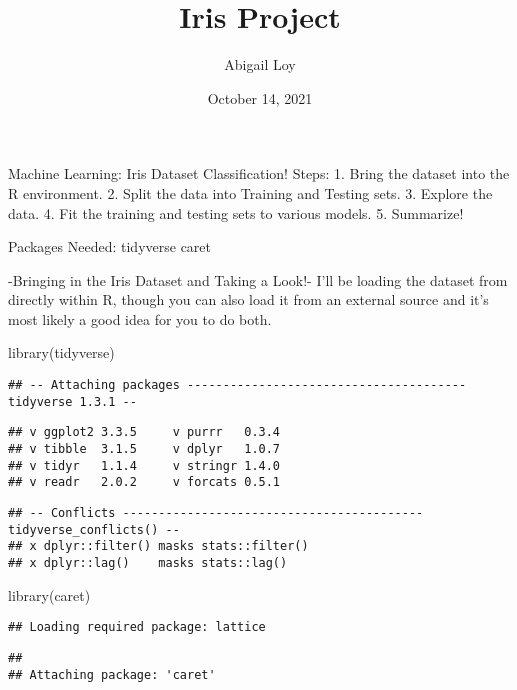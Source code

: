 \documentclass[
]{article}
\title{Iris Project}
\author{Abigail Loy}
\date{October 14, 2021}
\newenvironment{Shaded}{\begin{snugshade}}{\end{snugshade}}
\newcommand{\FunctionTok}[1]{\textcolor[rgb]{0.00,0.00,0.00}{#1}}
\newcommand{\NormalTok}[1]{#1}
\begin{document}
\maketitle

Machine Learning: Iris Dataset Classification! Steps: 1. Bring the
dataset into the R environment. 2. Split the data into Training and
Testing sets. 3. Explore the data. 4. Fit the training and testing sets
to various models. 5. Summarize!

Packages Needed: tidyverse caret

-Bringing in the Iris Dataset and Taking a Look!- I'll be loading the
dataset from directly within R, though you can also load it from an
external source and it's most likely a good idea for you to do both.

\begin{Shaded}
\begin{Highlighting}[]
\FunctionTok{library}\NormalTok{(tidyverse)}
\end{Highlighting}
\end{Shaded}

\begin{verbatim}
## -- Attaching packages --------------------------------------- tidyverse 1.3.1 --
\end{verbatim}

\begin{verbatim}
## v ggplot2 3.3.5     v purrr   0.3.4
## v tibble  3.1.5     v dplyr   1.0.7
## v tidyr   1.1.4     v stringr 1.4.0
## v readr   2.0.2     v forcats 0.5.1
\end{verbatim}

\begin{verbatim}
## -- Conflicts ------------------------------------------ tidyverse_conflicts() --
## x dplyr::filter() masks stats::filter()
## x dplyr::lag()    masks stats::lag()
\end{verbatim}

\begin{Shaded}
\begin{Highlighting}[]
\FunctionTok{library}\NormalTok{(caret)}
\end{Highlighting}
\end{Shaded}

\begin{verbatim}
## Loading required package: lattice
\end{verbatim}

\begin{verbatim}
## 
## Attaching package: 'caret'
\end{verbatim}
\end{document}
